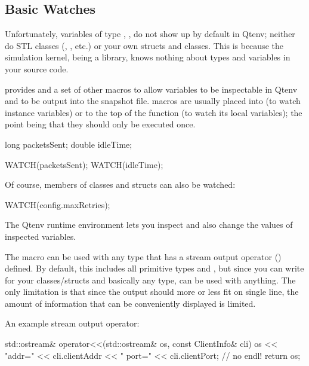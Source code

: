 \subsection{Basic Watches}
\label{sec:sim-lib:basic-watches}

Unfortunately, variables of type , , 
do not show up by default in Qtenv; neither do STL classes
(, , etc.) or your own structs and
classes. This is because the simulation kernel, being a library, knows
nothing about types and variables in your source code.

{\opp} provides  and a set of other macros to
allow variables to be inspectable in Qtenv and to be output into the snapshot
file.  macros are usually placed into
 (to watch instance variables) or to the top of the
 function (to watch its local variables); the point being
that they should only be executed once.

\begin{cpp}
long packetsSent;
double idleTime;

WATCH(packetsSent);
WATCH(idleTime);
\end{cpp}

Of course, members of classes and structs can also be watched:

\begin{cpp}
WATCH(config.maxRetries);
\end{cpp}

The Qtenv runtime environment lets you inspect and also change
the values of inspected variables.

The  macro can be used with any type that has a
stream output operator () defined. By default,
this includes all primitive types and , but since
you can write  for your classes/structs and basically
any type,  can be used with anything. The only limitation
is that since the output should more or less fit on single line, the
amount of information that can be conveniently displayed is limited.

An example stream output operator:

\begin{cpp}
std::ostream& operator<<(std::ostream& os, const ClientInfo& cli)
{
    os << "addr=" << cli.clientAddr << "  port=" << cli.clientPort; // no endl!
    return os;
}
\end{cpp}

